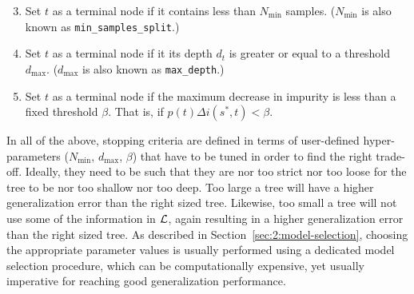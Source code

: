 \begin{enumerate}\setcounter{enumi}{2}

\item Set $t$ as a terminal node if it contains less than $N_\text{min}$ samples.
($N_\text{min}$ is also known as \texttt{min\_samples\_split}.)

\item Set $t$ as a terminal node if it its depth $d_t$ is greater or equal to a threshold $d_\text{max}$.
($d_\text{max}$ is also known as \texttt{max\_depth}.)

\item Set $t$ as a terminal node if the maximum decrease in impurity is less than
a fixed threshold $\beta$. That is, if $p(t) \Delta i(s^*, t) < \beta$.

\end{enumerate}

In all of the above, stopping criteria are defined in terms of user-defined
hyper-parameters ($N_\text{min}$, $d_\text{max}$, $\beta$) that have to be
tuned in order to find the right trade-off. Ideally, they need to
be such that they are nor too strict nor too loose for the tree to be nor too
shallow nor too deep. Too large a tree will have a higher generalization error
than the right sized tree. Likewise, too small a tree will not use some of the
information in ${\cal L}$, again resulting in a higher generalization error
than the right sized tree. As described in Section~\ref{sec:2:model-selection},
choosing the appropriate parameter values is usually performed using a dedicated
model selection procedure, which can be computationally expensive, yet usually
imperative for reaching good generalization performance.

